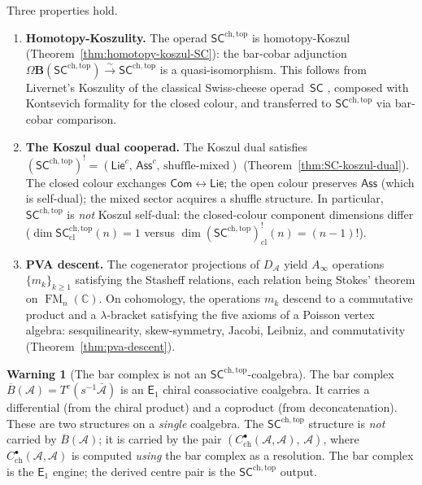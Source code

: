 \documentclass[11pt,reqno]{amsart}
\theoremstyle{definition}
\newtheorem{warning}[theorem]{Warning}
\theoremstyle{remark}
\newcommand{\cA}{\mathcal{A}}
\newcommand{\CC}{\mathbb{C}}
\newcommand{\barB}{\overline{B}}
\newcommand{\barA}{\bar{\cA}}
\newcommand{\Ainf}{A_{\infty}}
\newcommand{\Eone}{\mathsf{E}_{1}}
\newcommand{\SC}{\mathsf{SC}}
\newcommand{\SCchtop}{\mathsf{SC}^{\mathrm{ch,top}}}
\newcommand{\Ass}{\mathsf{Ass}}
\newcommand{\Com}{\mathsf{Com}}
\newcommand{\Lie}{\mathsf{Lie}}
\DeclareMathOperator{\FM}{FM}
\numberwithin{equation}{section}
\begin{document}
Three properties hold.

\begin{enumerate}[label=(\roman*)]
\item \textbf{Homotopy-Koszulity.}  The operad $\SCchtop$ is
  homotopy-Koszul (Theorem~\ref{thm:homotopy-koszul-SC}): the
  bar-cobar adjunction
  $\Omega\mathbf{B}(\SCchtop) \xrightarrow{\sim} \SCchtop$
  is a quasi-isomorphism.  This follows from Livernet's
  Koszulity of the classical Swiss-cheese operad~$\SC$
  \cite{Liv06}, composed with Kontsevich formality for
  the closed colour, and transferred to $\SCchtop$ via
  bar-cobar comparison.

\item \textbf{The Koszul dual cooperad.}  The Koszul dual
  satisfies
  $(\SCchtop)^! = (\Lie^c,\, \Ass^c,\, \text{shuffle-mixed})$
  (Theorem~\ref{thm:SC-koszul-dual}).  The closed colour
  exchanges $\Com \leftrightarrow \Lie$; the open colour
  preserves $\Ass$ (which is self-dual); the mixed sector
  acquires a shuffle structure.  In particular, $\SCchtop$ is
  \emph{not} Koszul self-dual: the closed-colour component
  dimensions differ ($\dim\SCchtop_{\mathrm{cl}}(n) = 1$ versus
  $\dim(\SCchtop)^!_{\mathrm{cl}}(n) = (n-1)!$).

\item \textbf{PVA descent.}  The cogenerator projections of
  $D_\cA$ yield $\Ainf$ operations $\{m_k\}_{k \geq 1}$
  satisfying the Stasheff relations, each relation being
  Stokes' theorem on $\FM_n(\CC)$.  On cohomology, the
  operations $m_k$ descend to a commutative product and a
  $\lambda$-bracket satisfying the five axioms of a Poisson
  vertex algebra: sesquilinearity, skew-symmetry, Jacobi,
  Leibniz, and commutativity
  (Theorem~\ref{thm:pva-descent}).
\end{enumerate}

\begin{warning}[The bar complex is not an
  $\SCchtop$-coalgebra]\label{warn:bar-not-SC}
The bar complex $\barB(\cA) = T^c(s^{-1}\barA)$ is an $\Eone$
chiral coassociative coalgebra.  It carries a differential
(from the chiral product) and a coproduct
(from deconcatenation).  These are two structures on a
\emph{single} coalgebra.  The $\SCchtop$ structure is
\emph{not} carried by $\barB(\cA)$; it is carried by the
pair $(C^\bullet_{\mathrm{ch}}(\cA,\cA),\, \cA)$, where
$C^\bullet_{\mathrm{ch}}(\cA,\cA)$ is computed \emph{using}
the bar complex as a resolution.  The bar complex is the
$\Eone$ engine; the derived centre pair is the $\SCchtop$
output.
\end{warning}
\end{document}
